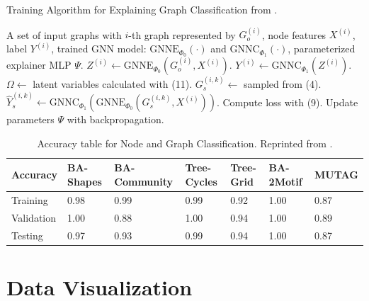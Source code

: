     \begin{algorithm}
    \caption{Training Algorithm for Explaining Graph Classification from \cite{luo2020parameterized}.}
    \label{alg:graph-alg}
    \begin{algorithmic}[1]
    \REQUIRE A set of input graphs with $i$-th graph represented by $G^{(i)}_o$, node features $X^{(i)}$, label $Y^{(i)}$, trained GNN model: $\text{GNNE}_{\Phi_0}(\cdot)$ and $\text{GNNC}_{\Phi_1}(\cdot)$, parameterized explainer MLP $\Psi$.
        \STATE $Z^{(i)} \leftarrow \text{GNNE}_{\Phi_0}(G^{(i)}_o, X^{(i)})$.
        \STATE $Y^{(i)} \leftarrow \text{GNNC}_{\Phi_1}(Z^{(i)})$.
    \ENDFOR
            \STATE $\Omega \leftarrow$ latent variables calculated with (11).
                \STATE $G^{(i,k)}_s \leftarrow$ sampled from (4).
                \STATE $\hat{Y}^{(i,k)}_s \leftarrow \text{GNNC}_{\Phi_1}(\text{GNNE}_{\Phi_0}(G^{(i,k)}_s, X^{(i)}))$.
            \ENDFOR
        \ENDFOR
        \STATE Compute loss with (9).
        \STATE Update parameters $\Psi$ with backpropagation.
    \ENDFOR
    \end{algorithmic}
\end{algorithm}

\begin{table}[h]
    \centering
    \small
    \begin{tabularx}{\linewidth}{l|X X X X|X X}
    \textbf{Accuracy} & BA-Shapes & BA-Community & Tree-Cycles & Tree-Grid & BA-2Motif & MUTAG \\
    \hline
    Training   & 0.98 & 0.99 & 0.99 & 0.92 & 1.00 & 0.87 \\
    Validation & 1.00 & 0.88 & 1.00 & 0.94 & 1.00 & 0.89 \\
    Testing    & 0.97 & 0.93 & 0.99 & 0.94 & 1.00 & 0.87 \\
    \end{tabularx}
    \caption[Accuracies of original GNN downstream task]{Accuracy table for Node and Graph Classification. Reprinted from \cite{luo2020parameterized}.}
    \label{tab:compact-accuracy}
\end{table}


\section{Data Visualization}
\label{sec:data_vis}

